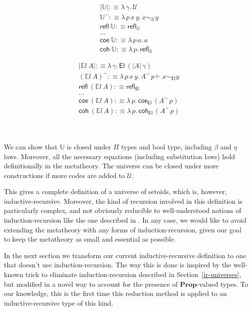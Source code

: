 \documentclass{easychair}
\newcommand{\setoidU}{\mathcal{U}}
\newcommand{\mProp}{\mathbf{Prop}}
\newcommand{\El}{\textsf{El}}
\newcommand{\Uty}{\mathds{U}}
\newcommand{\EL}{\mathds{E}l}
\newcommand{\reflu}{\textsf{refl}_\setoidU}
\newcommand{\reflel}{\textsf{refl}_\El}
\newcommand{\eqel}[3]{#1 \vdash #2 \sim_\El #3}
\begin{document}
\begin{minipage}{0.5\textwidth}
\begin{align*}
  & | \Uty | :\equiv \lambda\, \gamma . \, \setoidU \\
  & \Uty^\sim :\equiv \lambda \,p\, x\, y . \,x \sim_{\setoidU} y \\
  & \textsf{refl}\ \Uty :\equiv \reflu \\
  & ... \\
  & \textsf{coe}\ \Uty :\equiv \lambda\,p\,a . \, a \\
  & \textsf{coh}\ \Uty :\equiv \lambda\,p . \, \reflu
\end{align*}
\end{minipage}
\begin{minipage}{0.5\textwidth}
\begin{align*}
  & | \EL\ A | :\equiv \lambda \, \gamma . \, \El\ (| A | \,\gamma) \\
  & (\EL\ A)^\sim :\equiv \lambda \, p \, x \, y . \, \eqel{A^\sim\,p}{x}{y} \\
  & \textsf{refl}\ (\EL\ A) :\equiv \reflel \\
  & ... \\
  & \textsf{coe}\ (\EL\ A) :\equiv \lambda\,p.\, \textsf{coe}_{\El}\,(A^\sim\,p) \\
  & \textsf{coh}\ (\EL\ A) :\equiv \lambda\,p.\, \textsf{coh}_{\El}\,(A^\sim\,p)
\end{align*}
\end{minipage}
\\
~
\\

We can show that $\Uty$ is closed under $\Pi$ types and bool type, including
$\beta$ and $\eta$ laws. Moreover, all the necessary equations (including
substitution laws) hold definitionally in the metatheory.
The universe can be closed under more constructions if more codes are added to
$\setoidU$.

This gives a complete definition of a universe of setoids, which is, however,
inductive-recursive. Moreover, the kind of recursion involved in this definition
is particularly complex, and not obviously reducible to well-understood notions
of induction-recursion like the one described in \cite{dybjer-setzer}. In any
case, we would like to avoid extending the metatheory with any forms of
induction-recursion, given our goal to keep the metatheory as small and
essential as possible.

In the next section we transform our current inductive-recursive definition to
one that doesn't use induction-recursion.
%
The way this is done is inspired by the well-known trick to eliminate
induction-recursion described in Section~\ref{ir-universes}, but modified in a
novel way to account for the presence of $\mProp$-valued types. To our
knowledge, this is the first time this reduction method is applied to an
inductive-recursive type of this kind.
\end{document}
